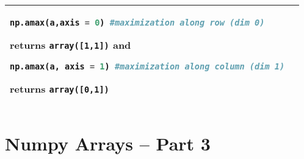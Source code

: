 \begin{tabular}[]{@{}ll@{}}
\begin{minipage}[t]{0.72\columnwidth}
\begin{lstlisting}[language=Python]
np.amax(a,axis = 0) #maximization along row (dim 0)
\end{lstlisting}

returns \lstinline!array([1,1])! and

\begin{lstlisting}[language=Python]
np.amax(a, axis = 1) #maximization along column (dim 1)
\end{lstlisting}

returns \lstinline!array([0,1])!
\end{minipage}\tabularnewline


\bottomrule
\end{tabular}

\section{Numpy Arrays -- Part 3}\label{numpy-arrays_pt3}

